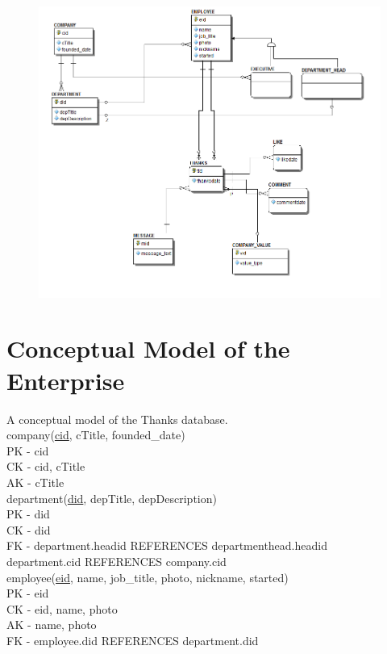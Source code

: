 \documentclass[11pt]{report}
\begin{document}
\begin{figure}[!htb]
\centering
\includegraphics[scale=.7]{./images/ERD11-4.png}
\end{figure}
\clearpage

\section{Conceptual Model of the Enterprise}
A conceptual model of the Thanks database. \\

company(\underline{cid}, cTitle, founded\_date) \\
PK - cid \\
CK - cid, cTitle \\
AK - cTitle \\

department(\underline{did}, depTitle, depDescription) \\
PK - did \\
CK - did \\
FK - department.headid REFERENCES departmenthead.headid \\
     department.cid REFERENCES company.cid \\

employee(\underline{eid}, name, job\_title, photo, nickname, started) \\
PK - eid \\
CK - eid, name, photo \\
AK - name, photo \\
FK - employee.did REFERENCES department.did \\
\end{document}
